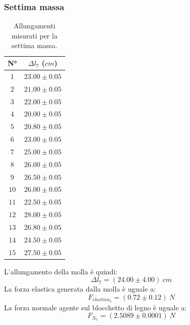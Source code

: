 \documentclass[11pt]{article}
\begin{document}
\subsubsection{Settima massa}
\begin{table}[H]
\centering
\begin{tabular}{|c|c|}
\hline
\textbf{N°} & \textbf{$\Delta l_7$ ($cm$)}\\
\hline
$1$ & $23.00\pm 0.05$ \\
\hline
$2$ & $21.00\pm 0.05$ \\
\hline
$3$ & $22.00\pm 0.05$ \\
\hline
$4$ & $20.00\pm 0.05$ \\
\hline
$5$ & $20.80\pm 0.05$ \\
\hline
$6$ & $23.00\pm 0.05$ \\
\hline
$7$ & $25.00\pm 0.05$ \\
\hline
$8$ & $26.00\pm 0.05$ \\
\hline
$9$ & $26.50\pm 0.05$ \\
\hline
$10$ & $26.00\pm 0.05$ \\
\hline
$11$ & $22.50\pm 0.05$ \\
\hline
$12$ & $28.00\pm 0.05$ \\
\hline
$13$ & $26.80\pm 0.05$ \\
\hline
$14$ & $24.50\pm 0.05$ \\
\hline
$15$ & $27.50\pm 0.05$ \\
\hline
\end{tabular}
\caption{Allungamenti misurati per la settima massa.}
\label{tab:}
\end{table}
L'allungamento della molla è quindi:
\begin{equation}
    \Delta l_7=(24.00\pm 4.00)\ cm
\end{equation}
La forza elastica generata dalla molla è uguale a:
\begin{equation}
    F_{elastica_7} = (0.72\pm 0.12)\ N
\end{equation}
La forza normale agente sul blocchetto di legno è uguale a:
\begin{equation}
    F_{N_7} = (2.5089\pm 0.0001)\ N
\end{equation}
\end{document}
